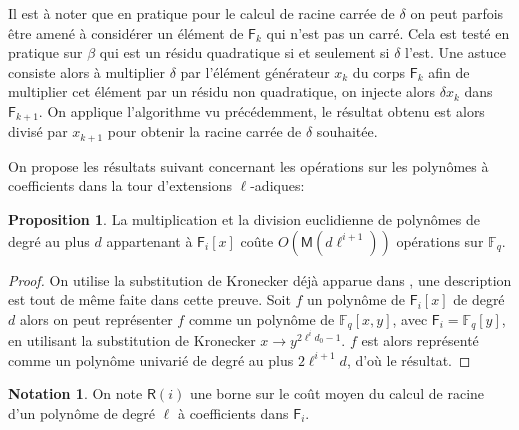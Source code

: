 \documentclass[10pt,a4paper]{book}
\theoremstyle{plain}
\theoremstyle{definition}
\theoremstyle{definition}
\theoremstyle{definition}
\theoremstyle{definition}
\newtheorem{prop}[thm]{Proposition}
\theoremstyle{definition}
\theoremstyle{remark}
\theoremstyle{remark}
\theoremstyle{definition}
\newtheorem{nota}[thm]{Notation}
\begin{document}
Il est à noter que en pratique pour le calcul de racine carrée de $\delta$ on peut parfois être amené à considérer un élément de $\mathsf{F}_k$ qui n'est pas un carré. Cela est testé en pratique sur $\beta$ qui est un résidu quadratique si et seulement si $\delta$ l'est. Une astuce consiste alors à multiplier $\delta$ par l'élément générateur $x_{k}$ du corps $\mathsf{F}_k$ afin  de multiplier cet élément par un résidu non quadratique, on injecte alors $\delta x_k$ dans $\mathsf{F}_{k+1}$. On applique l'algorithme vu précédemment, le résultat obtenu est alors divisé par $x_{k+1}$ pour obtenir la racine carrée de $\delta$ souhaitée.

On propose les résultats suivant concernant les opérations sur les 
polynômes à coefficients dans la tour d'extensions $\ell$-adiques:

\begin{prop}
\label{pro:mult:pol}
La multiplication et la division euclidienne de polynômes de degré au plus $d$ 
appartenant à $\mathsf{F}_i[x]$ coûte $O(\mathsf{M}(d\ell^{i+1}))$ opérations sur 
$\mathbb{F}_q$.
\end{prop}

\begin{proof} \sloppy
On utilise la substitution de Kronecker déjà apparue 
dans \newline \cite[Lemma 2.2]{vzGShoup92}, une description est tout de même faite dans 
cette preuve. Soit $f$ un polynôme de $\mathsf{F}_{i}[x]$ de degré $d$ alors on 
peut représenter $f$ comme un polynôme de $\mathbb{F}_q[x,y]$, avec 
$\mathsf{F}_i=\mathbb{F}_q[y]$, en utilisant la substitution de 
Kronecker $x \rightarrow y^{2\ell^{i}d_0-1}$. $f$ est alors représenté
comme un polynôme univarié de degré au plus $2\ell^{i+1} d$, d'où le résultat. \fussy
\end{proof}

\begin{nota}
\label{not:cout:R}
On note $\mathsf{R}(i)$ une borne sur le coût moyen du calcul de racine d'un polynôme de degré $\ell$ à coefficients dans $\mathsf{F}_i$.
\end{nota}
\end{document}
